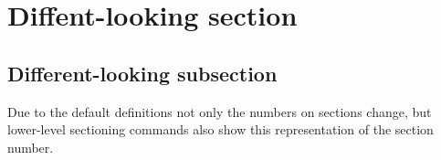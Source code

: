\documentclass{article}
\begin{document}
  \section{Diffent-looking section}
  \subsection{Different-looking subsection}
  Due to the default definitions not only the numbers
  on sections change, but lower-level sectioning commands
  also show this representation of the section number.
\end{document}
